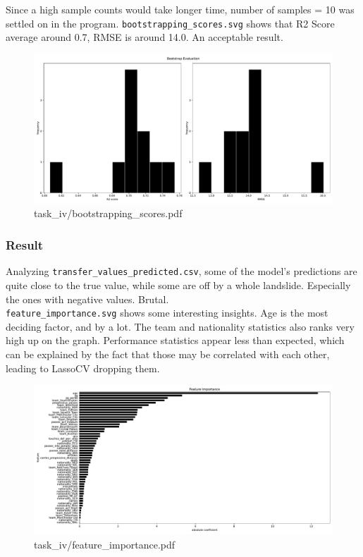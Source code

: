 \documentclass{report}
\begin{document}
\noindent
Since a high sample counts would take longer time, number of samples = 10 was settled on in the program.
\verb|bootstrapping_scores.svg| shows that R2 Score average around 0.7, RMSE is around 14.0. An 
acceptable result.
\begin{figure}[ht!]
    \centering
    \includegraphics[width=\textwidth]{../output/task_iv/bootstrapping_scores.pdf}
    \caption{task\_iv/bootstrapping\_scores.pdf}
\end{figure}

\newpage
\subsubsection{Result}
Analyzing \verb|transfer_values_predicted.csv|, some of the model's predictions are quite close to
the true value, while some are off by a whole landslide. Especially the ones with negative values. 
Brutal. \\
\verb|feature_importance.svg| shows some interesting insights. Age is the most deciding factor, and
by a lot. The team and nationality statistics also ranks very high up on the graph. Performance 
statistics appear less than expected, which can be explained by the fact that those may be correlated 
with each other, leading to LassoCV dropping them.
\begin{figure}[ht!]
    \centering
    \includegraphics[width=\textwidth]{../output/task_iv/feature_importance.pdf}
    \caption{task\_iv/feature\_importance.pdf}
\end{figure}
\end{document}
